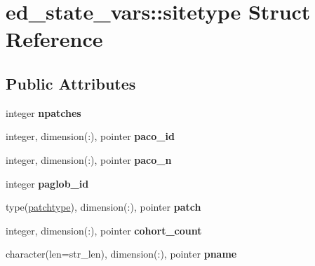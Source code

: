 \hypertarget{structed__state__vars_1_1sitetype}{
\section{ed\_\-state\_\-vars::sitetype Struct Reference}
\label{structed__state__vars_1_1sitetype}
}
\subsection*{Public Attributes}
\begin{DoxyCompactItemize}
\item 
\hypertarget{structed__state__vars_1_1sitetype_a3225f7a2a86ac1667828ea13baea3d32}{
integer {\bfseries npatches}}
\label{structed__state__vars_1_1sitetype_a3225f7a2a86ac1667828ea13baea3d32}

\item 
\hypertarget{structed__state__vars_1_1sitetype_a89f34845562d859a97c74b8a7abbfa4b}{
integer, dimension(:), pointer {\bfseries paco\_\-id}}
\label{structed__state__vars_1_1sitetype_a89f34845562d859a97c74b8a7abbfa4b}

\item 
\hypertarget{structed__state__vars_1_1sitetype_a1e1292511585fb52e1cf7d485232055a}{
integer, dimension(:), pointer {\bfseries paco\_\-n}}
\label{structed__state__vars_1_1sitetype_a1e1292511585fb52e1cf7d485232055a}

\item 
\hypertarget{structed__state__vars_1_1sitetype_ae3b8d3e3d980ea2b191f93ab1f82e9f9}{
integer {\bfseries paglob\_\-id}}
\label{structed__state__vars_1_1sitetype_ae3b8d3e3d980ea2b191f93ab1f82e9f9}

\item 
\hypertarget{structed__state__vars_1_1sitetype_a46ca0452c92c2cfe1a232d101b12a3d4}{
type(\hyperlink{structed__state__vars_1_1patchtype}{patchtype}), dimension(:), pointer {\bfseries patch}}
\label{structed__state__vars_1_1sitetype_a46ca0452c92c2cfe1a232d101b12a3d4}

\item 
\hypertarget{structed__state__vars_1_1sitetype_a3c466190360659bffd4a98358a95f936}{
integer, dimension(:), pointer {\bfseries cohort\_\-count}}
\label{structed__state__vars_1_1sitetype_a3c466190360659bffd4a98358a95f936}

\item 
\hypertarget{structed__state__vars_1_1sitetype_a36551034a4f092aae3bfcec7bfff8136}{
character(len=str\_\-len), dimension(:), pointer {\bfseries pname}}
\label{structed__state__vars_1_1sitetype_a36551034a4f092aae3bfcec7bfff8136}


\end{DoxyCompactItemize}
